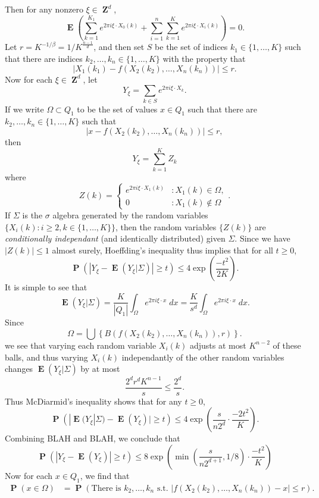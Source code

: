 \documentclass[12pt,reqno]{article}
\numberwithin{equation}{section}
\DeclareMathOperator{\ZZ}{\mathbf{Z}}
\DeclareMathOperator{\EE}{\mathbf{E}}
\DeclareMathOperator{\PP}{\mathbf{P}}
\begin{document}
Then for any nonzero $\xi \in \ZZ^d$,
%
\begin{equation} \label{equationFIJCIJVIJVIVJIV1231312}
    \EE \left( \sum_{k = 1}^{K_1} e^{2 \pi i \xi \cdot X_0(k)} + \sum_{i = 1}^n \sum_{k = 1}^K e^{2 \pi i \xi \cdot X_i(k)} \right) = 0.
\end{equation}
%
Let $r = K^{-1/\beta} = 1/K^{\frac{n-1}{d}}$, and then set $S$ be the set of indices $k_1 \in \{ 1, \dots, K \}$ such that there are indices $k_2,\dots,k_n \in \{ 1,\dots,K \}$ with the property that
%
\[ |X_1(k_1) - f(X_2(k_2),\dots,X_n(k_n))| \leq r. \]
%
Now for each $\xi \in \ZZ^d$, let
%
\[ Y_\xi = \sum_{k \in S} e^{2 \pi i \xi \cdot X_k}. \]
%
If we write $\Omega \subset Q_1$ to be the set of values $x \in Q_1$ such that there are $k_2,\dots,k_n \in \{ 1,\dots,K \}$ such that
%
\[ |x - f(X_2(k_2),\dots,X_n(k_n))| \leq r, \]
%
then
%
\[ Y_\xi = \sum_{k = 1}^K Z_k \]
%
where
%
\[ Z(k) = \begin{cases} e^{2 \pi i \xi \cdot X_1(k)} &: X_1(k) \in \Omega, \\ 0 &: X_1(k) \not \in \Omega \end{cases}. \]
%
If $\Sigma$ is the $\sigma$ algebra generated by the random variables $\{ X_i(k) : i \geq 2, k \in \{ 1, \dots, K \} \}$, then the random variables $\{ Z(k) \}$ are \emph{conditionally independant} (and identically distributed) given $\Sigma$. Since we have $|Z(k)| \leq 1$ almost surely, Hoeffding's inequality thus implies that for all $t \geq 0$,
%
\[ \PP \left( \left| Y_\xi - \EE(Y_\xi|\Sigma) \right| \geq t \right) \leq 4 \exp \left( \frac{-t^2}{2K} \right). \]
%
It is simple to see that
%
\[ \EE(Y_\xi | \Sigma) = \frac{K}{|Q_1|} \int_\Omega e^{2 \pi i \xi \cdot x}\; dx=  \frac{K}{s^d} \int_\Omega e^{2 \pi i \xi \cdot x}\; dx. \]
%
Since
%
\[ \Omega = \bigcup \left\{ B(f(X_2(k_2),\dots,X_n(k_n)),r) \right\}. \]
%
we see that varying each random variable $X_i(k)$ adjusts at most $K^{n-2}$ of these balls, and thus varying $X_i(k)$ independantly of the other random variables changes $\EE(Y_\xi|\Sigma)$ by at most
%
\[ \frac{2^d r^d K^{n-1}}{s} \leq \frac{2^d}{s}. \]
% 
Thus McDiarmid's inequality shows that for any $t \geq 0$,
%
\[ \PP \left( |\EE(Y_\xi|\Sigma) - \EE(Y_\xi)| \geq t \right) \leq 4 \exp \left( \frac{s}{n 2^d} \cdot \frac{-2t^2}{K} \right). \]
%
Combining BLAH and BLAH, we conclude that
%
\[ \PP \left( | Y_\xi - \EE(Y_\xi) | \geq t  \right) \leq 8 \exp \left( \min \left( \frac{s}{n2^{d+1}}, 1/8 \right) \cdot \frac{-t^2}{K} \right) \]
%
Now for each $x \in Q_1$, we find that
%
\begin{align*}
    \PP(x \in \Omega) &= \PP(\text{There is $k_2,\dots,k_n$ s.t. $|f(X_2(k_2),\dots,X_n(k_n)) - x| \leq r$}).
\end{align*}
\end{document}
